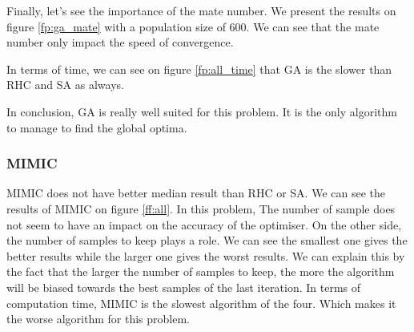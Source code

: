 \documentclass[twocolumn, 10pt]{article}
\begin{document}
				Finally, let's see the importance of the mate number. We present the results on figure \ref{fp:ga_mate} with a population size of 600. We can see that the mate number only impact the speed of convergence.

				In terms of time, we can see on figure \ref{fp:all_time} that GA is the slower than RHC and SA as always.

				In conclusion, GA is really well suited for this problem. It is the only algorithm to manage to find the global optima.
			\subsubsection*{MIMIC}
				MIMIC does not have better median result than RHC or SA. We can see the results of MIMIC on figure \ref{ff:all}. In this problem, The number of sample does not seem to have an impact on the accuracy of the optimiser. On the other side, the number of samples to keep plays a role. We can see the smallest one gives the better results while the larger one gives the worst results. We can explain this by the fact that the larger the number of samples to keep, the more the algorithm will be biased towards the best samples of the last iteration. In terms of computation time, MIMIC is the slowest algorithm of the four. Which makes it the worse algorithm for this problem.
\end{document}
